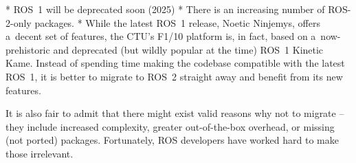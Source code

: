 \begitems
* ROS~1 will be deprecated soon (2025)
* There is an increasing number of ROS-2-only packages.
* While the latest ROS~1 release, Noetic Ninjemys, offers a~decent set of features, the CTU's F1/10 platform is, in fact, based on a~now-prehistoric and deprecated (but wildly popular at the time) ROS~1 Kinetic Kame. Instead of spending time making the codebase compatible with the latest ROS~1, it is better to migrate to ROS~2 straight away and benefit from its new features.
\enditems

It is also fair to admit that there might exist valid reasons why not to migrate – they include increased complexity, greater out-of-the-box overhead, or missing (not ported) packages. Fortunately, ROS developers have worked hard to make those irrelevant.
